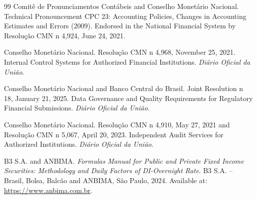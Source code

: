 \documentclass[11pt, a4paper]{article}
\theoremstyle{definition}
\theoremstyle{plain}
\theoremstyle{remark}
\begin{document}
\begin{thebibliography}{99}
Comit{\^e} de Pronunciamentos Cont{\'a}beis and Conselho Monet{\'a}rio Nacional.
\newblock Technical Pronouncement CPC 23: Accounting Policies, Changes in Accounting Estimates and Errors (2009).
\newblock Endorsed in the National Financial System by Resolu{\c{c}}{\~a}o CMN n{\textordmasculine} 4,924, June 24, 2021.

Conselho Monet{\'a}rio Nacional.
\newblock Resolu{\c{c}}{\~a}o CMN n{\textordmasculine} 4,968, November 25, 2021. Internal Control Systems for Authorized Financial Institutions. \emph{Di{\'a}rio Oficial da Uni{\~a}o}.

Conselho Monet{\'a}rio Nacional and Banco Central do Brasil.
\newblock Joint Resolution n{\textordmasculine} 18, January 21, 2025. Data Governance and Quality Requirements for Regulatory Financial Submissions. \emph{Di{\'a}rio Oficial da Uni{\~a}o}.

Conselho Monet{\'a}rio Nacional.
\newblock Resolu{\c{c}}{\~a}o CMN n{\textordmasculine} 4,910, May 27, 2021 and Resolu{\c{c}}{\~a}o CMN n{\textordmasculine} 5,067, April 20, 2023. Independent Audit Services for Authorized Institutions. \emph{Di{\'a}rio Oficial da Uni{\~a}o}.

B3 S.A. and ANBIMA.
\newblock \emph{Formulas Manual for Public and Private Fixed Income Securities: Methodology and Daily Factors of DI-Overnight Rate}.
\newblock B3 S.A. -- Brasil, Bolsa, Balc{\~a}o and ANBIMA, S{\~a}o Paulo, 2024.
\newblock Available at: \url{https://www.anbima.com.br}.

\end{thebibliography}
\end{document}
